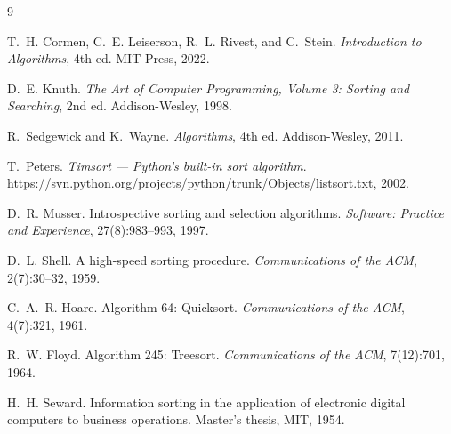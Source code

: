 \documentclass[11pt,a4paper]{article}
\begin{document}

\begin{thebibliography}{9}

T.~H. Cormen, C.~E. Leiserson, R.~L. Rivest, and C.~Stein.
\newblock \emph{Introduction to Algorithms}, 4th ed.
\newblock MIT Press, 2022.

D.~E. Knuth.
\newblock \emph{The Art of Computer Programming, Volume 3: Sorting and Searching}, 2nd ed.
\newblock Addison-Wesley, 1998.

R.~Sedgewick and K.~Wayne.
\newblock \emph{Algorithms}, 4th ed.
\newblock Addison-Wesley, 2011.

T.~Peters.
\newblock \emph{Timsort — Python's built-in sort algorithm}.
\newblock \url{https://svn.python.org/projects/python/trunk/Objects/listsort.txt}, 2002.

D.~R. Musser.
\newblock Introspective sorting and selection algorithms.
\newblock \emph{Software: Practice and Experience}, 27(8):983--993, 1997.

D.~L. Shell.
\newblock A high-speed sorting procedure.
\newblock \emph{Communications of the ACM}, 2(7):30--32, 1959.

C.~A.~R. Hoare.
\newblock Algorithm 64: Quicksort.
\newblock \emph{Communications of the ACM}, 4(7):321, 1961.

R.~W. Floyd.
\newblock Algorithm 245: Treesort.
\newblock \emph{Communications of the ACM}, 7(12):701, 1964.

H.~H. Seward.
\newblock Information sorting in the application of electronic digital computers to business operations.
\newblock Master's thesis, MIT, 1954.

\end{thebibliography}
\end{document}
